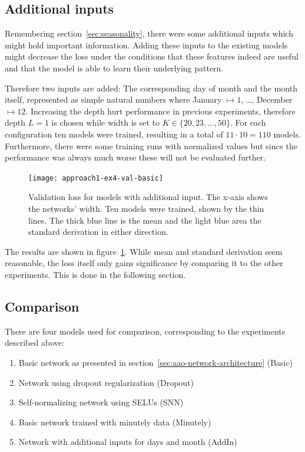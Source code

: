 \subsection{Additional inputs}

Remembering section~\ref{sec:seasonality}, there were some additional inputs which might hold important information. Adding these inputs to the existing models might decrease the loss under the conditions that these features indeed are useful and that the model is able to learn their underlying pattern. 

Therefore two inputs are added: The corresponding day of month and the month itself, represented as simple natural numbers where January $\mapsto 1$, \dots, December $\mapsto 12$. Increasing the depth hurt performance in previous experiments, therefore depth $L = 1$ is chosen while width is set to $K \in \{20,23,\dots,50\}$. For each configuration ten models were trained, resulting in a total of $11 \cdot 10 = 110$ models. Furthermore, there were some training runs with normalized values but since the performance was always much worse these will not be evaluated further.

\begin{figure}[h!]
	\centering
	\texttt{[image: approach1-ex4-val-basic]}
	\caption[Validation loss using additional inputs with respect to width]{Validation loss for models with additional input. The x-axis shows the networks' width. Ten models were trained, shown by the thin lines. The thick blue line is the mean and the light blue area the standard derivation in either direction.}
	\label{fig:approach1-ex4}
\end{figure}

\newpage

The results are shown in figure~\ref{fig:approach1-ex4}. While mean and standard derivation seem reasonable, the loss itself only gains significance by comparing it to the other experiments. This is done in the following section.

\subsection{Comparison}
\label{sec:aao-comparison}

There are four models used for comparison, corresponding to the experiments described above:

\begin{enumerate}
	\item Basic network as presented in section~\ref{sec:aao-network-architecture} (Basic)
	\item Network using dropout regularization (Dropout)
	\item Self-normalizing network using SELUs (SNN)
	\item Basic network trained with minutely data (Minutely)
	\item Network with additional inputs for days and month (AddIn)
\end{enumerate}

